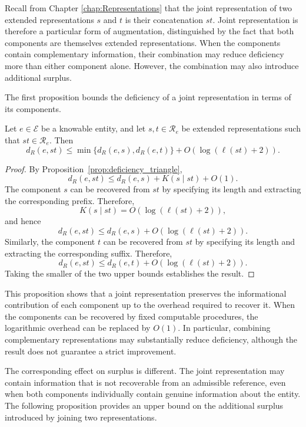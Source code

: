 Recall from Chapter \ref{chap:Representations} that the joint representation of two extended representations $s$ and $t$ is their concatenation $st$. Joint representation is therefore a particular form of augmentation, distinguished by the fact that both components are themselves extended representations. When the components contain complementary information, their combination may reduce deficiency more than either component alone. However, the combination may also introduce additional surplus.

The first proposition bounds the deficiency of a joint representation in terms of its components.

\begin{proposition}
Let $e\in\mathcal E$ be a knowable entity, and let $s,t\in\mathcal R_e$ be extended representations such that $st\in\mathcal R_e$. Then
\[
d_R(e,st) \le \min\{d_R(e,s),d_R(e,t)\} + O(\log(\ell(st)+2)).
\]
\end{proposition}
\begin{proof}
By Proposition~\ref{prop:deficiency_triangle},
\[
d_R(e,st) \le d_R(e,s) + K(s\mid st)+O(1).
\]
The component $s$ can be recovered from $st$ by specifying its length and extracting the corresponding prefix. Therefore,
\[
K(s\mid st) = O(\log(\ell(st)+2)),
\]
and hence
\[
d_R(e,st) \le d_R(e,s) + O(\log(\ell(st)+2)).
\]
Similarly, the component $t$ can be recovered from $st$ by specifying its length and extracting the corresponding suffix. Therefore,
\[
d_R(e,st) \le d_R(e,t) + O(\log(\ell(st)+2)).
\]
Taking the smaller of the two upper bounds establishes the result.
\end{proof}

This proposition shows that a joint representation preserves the informational contribution of each component up to the overhead required to recover it. When the components can be recovered by fixed computable procedures, the logarithmic overhead can be replaced by $O(1)$. In particular, combining complementary representations may substantially reduce deficiency, although the result does not guarantee a strict improvement.

The corresponding effect on surplus is different. The joint representation may contain information that is not recoverable from an admissible reference, even when both components individually contain genuine information about the entity. The following proposition provides an upper bound on the additional surplus introduced by joining two representations.

